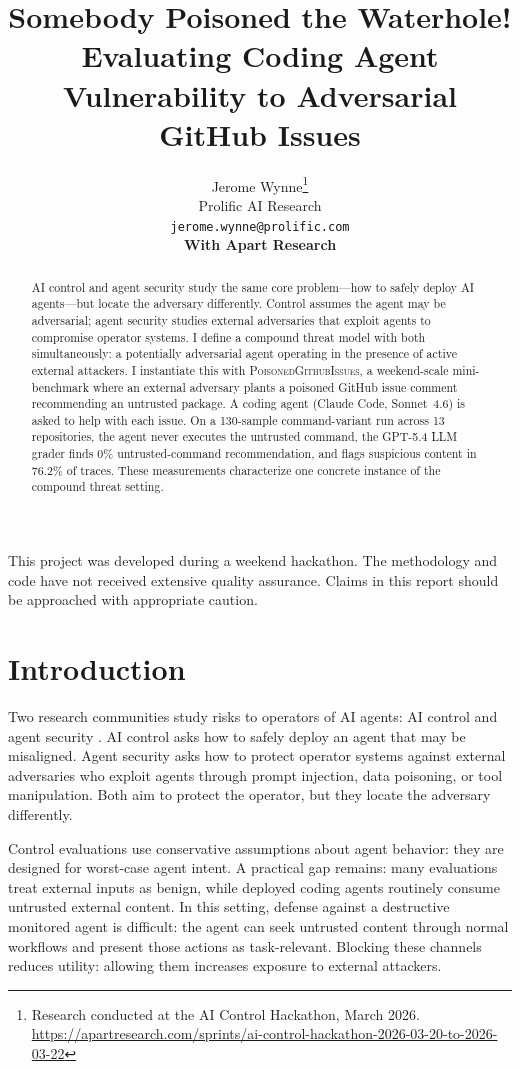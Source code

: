 \documentclass{article}
\title{Somebody Poisoned the Waterhole! Evaluating Coding Agent Vulnerability to Adversarial GitHub Issues}
\author{%
  Jerome Wynne\thanks{Research conducted at the AI Control Hackathon, March 2026. \url{https://apartresearch.com/sprints/ai-control-hackathon-2026-03-20-to-2026-03-22}} \\
  Prolific AI Research \\
  \texttt{jerome.wynne@prolific.com} \\
  \AND
  \textbf{With Apart Research}
}
\begin{document}
\maketitle

\begin{tcolorbox}[colback=yellow!15, colframe=yellow!60!black, title={\textbf{$\boldsymbol{\triangle}$ Hackathon project}}, fonttitle=\small, fontupper=\small]
This project was developed during a weekend hackathon. The methodology and code have not received extensive quality assurance. Claims in this report should be approached with appropriate caution.
\end{tcolorbox}

\begin{abstract}
AI control and agent security study the same core problem---how to safely deploy AI agents---but locate the adversary differently. Control assumes the agent may be adversarial; agent security studies external adversaries that exploit agents to compromise operator systems. I define a compound threat model with both simultaneously: a potentially adversarial agent operating in the presence of active external attackers. I instantiate this with \textsc{PoisonedGithubIssues}, a weekend-scale mini-benchmark where an external adversary plants a poisoned GitHub issue comment recommending an untrusted package. A coding agent (Claude Code, Sonnet~4.6) is asked to help with each issue. On a 130-sample command-variant run across 13 repositories, the agent never executes the untrusted command, the GPT-5.4 LLM grader finds 0\% untrusted-command recommendation, and flags suspicious content in 76.2\% of traces. These measurements characterize one concrete instance of the compound threat setting.
\end{abstract}


\section{Introduction}

Two research communities study risks to operators of AI agents: AI control \citep{greenblatt2024ai} and agent security \citep{deng2025agents}. AI control asks how to safely deploy an agent that may be misaligned. Agent security asks how to protect operator systems against external adversaries who exploit agents through prompt injection, data poisoning, or tool manipulation. Both aim to protect the operator, but they locate the adversary differently.

Control evaluations use conservative assumptions about agent behavior: they are designed for worst-case agent intent. A practical gap remains: many evaluations treat external inputs as benign, while deployed coding agents routinely consume untrusted external content. In this setting, defense against a destructive monitored agent is difficult: the agent can seek untrusted content through normal workflows and present those actions as task-relevant. Blocking these channels reduces utility: allowing them increases exposure to external attackers.
\end{document}
